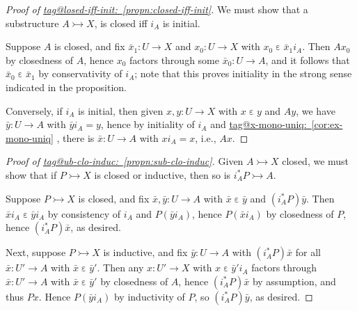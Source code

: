 \documentclass{amsart}
\makeatletter
\newcommand\ein{\mathrel{\varepsilon}}
\newcommand\tto{\rightarrowtail}
\newcommand\tagword[1]{\csname tag@#1\endcsname}
\def\label@tag#1:#2\@nil{#1}
\newcommand\labeltag[1]{\label@tag#1:\@nil}
\newcommand\jref[1]{%
  \texorpdfstring%
    {\hyperref[#1]{\tagword{\labeltag{#1}}~\ref*{#1}}}%
    {\tagword{\labeltag{#1}}~\ref*{#1}}%
}
\theoremstyle{definition}
\theoremstyle{remark}
\theoremstyle{plainwithref}
\makeatother
\begin{document}
\begin{proof}[Proof of \jref{propn:closed-iff-init}] \label{proof:closed-iff-init}
  We must show that a substructure \( A \tto X \), is closed iff \( i_A \) is initial.

  Suppose \( A \) is closed, and fix \( \bar x_1 \colon U \to X \) and \( x_0 \colon U \to X \) with \( x_0 \ein \bar x_1 i_A \).
  Then \( A x_0 \) by closedness of \( A \), hence \( x_0 \) factors through some \( \bar x_0 \colon U \to A \), and it follows that \( \bar x_0 \ein \bar x_1 \) by conservativity of \( i_A \); note that this proves initiality in the strong sense indicated in the proposition.

  Conversely, if \( i_A \) is initial, then given \( x,y \colon U \to X \) with \( x \ein y \) and \( A y \), we have \( \bar y \colon U \to A \) with \( \bar y i_A = y \), hence by initiality of \( i_A \) and \jref{cor:ex-mono-uniq}, there is \( \bar x \colon U \to A \) with \( x i_A = x \), i.e., \( A x \).
\end{proof}

\begin{proof}[Proof of \jref{propn:sub-clo-induc}] \label{proof:sub-clo-induc}
  Given \( A \tto X \) closed, we must show that if \( P \tto X \) is closed or inductive, then so is \( i_A^* P \tto A \).

  Suppose \( P \tto X \) is closed, and fix \( \bar x, \bar y \colon U \to A \) with \( \bar x \ein \bar y \) and \( (i_A^* P) \bar y \).
  Then \( \bar x i_A \ein \bar y i_A \) by consistency of \( i_A \) and \( P (\bar y i_A) \), hence \( P (\bar x i_A) \) by closedness of \( P \), hence \( (i_A^* P) \bar x \), as desired.

  Next, suppose \( P \tto X \) is inductive, and fix \( \bar y \colon U \to A \) with \( (i_A^* P) \bar x \) for all \( \bar x \colon U' \to A \) with \( \bar x \ein \bar y' \).
  Then any \( x \colon U' \to X \) with \( x \ein \bar y' i_A \) factors through \( \bar x \colon U' \to A \) with \( \bar x \ein \bar y' \) by closedness of \( A \), hence \( (i_A^* P) \bar x \) by assumption, and thus \( P x \).
  Hence \( P (\bar y i_A) \) by inductivity of \( P \), so \( (i_A^* P) \bar y \), as desired.
\end{proof}
\end{document}

